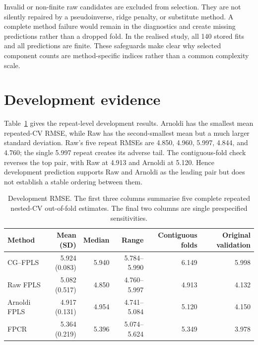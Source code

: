 Invalid or non-finite raw candidates are excluded from selection.  They are not
silently repaired by a pseudoinverse, ridge penalty, or substitute method.  A
complete method failure would remain in the diagnostics and create missing
predictions rather than a dropped fold.  In the realised study, all 140 stored
fits and all predictions are finite.  These safeguards make clear why selected
component counts are method-specific indices rather than a common complexity
scale.

\section{Development evidence}
\label{sec:app-spectroscopy-development}

Table~\ref{tab:app-spectroscopy-development-rmse} gives the repeat-level
development results.  Arnoldi has the smallest mean repeated-CV RMSE, while
Raw has the second-smallest mean but a much larger standard deviation.  Raw's
five repeat RMSEs are 4.850, 4.960, 5.997, 4.844, and 4.760; the single 5.997
repeat creates its adverse tail.  The contiguous-fold check reverses the top
pair, with Raw at 4.913 and Arnoldi at 5.120.  Hence development prediction
supports Raw and Arnoldi as the leading pair but does not establish a stable
ordering between them.

\begin{table}[htbp]
    \centering
    \scriptsize
    \caption[Repeated-development prediction errors]{Development RMSE.  The first three columns summarise five complete
    repeated nested-CV out-of-fold estimates.  The final two columns are single
    prespecified sensitivities.}
    \label{tab:app-spectroscopy-development-rmse}
    \begin{tabular}{@{}lrrrrr@{}}
        \toprule
        Method & Mean (SD) & Median & Range & Contiguous folds & Original validation \\
        \midrule
        CG--FPLS     & 5.924 (0.083) & 5.940 & 5.784--5.990 & 6.149 & 5.998 \\
        Raw FPLS     & 5.082 (0.517) & 4.850 & 4.760--5.997 & 4.913 & 4.132 \\
        Arnoldi FPLS & 4.917 (0.131) & 4.954 & 4.741--5.084 & 5.120 & 4.150 \\
        FPCR         & 5.364 (0.219) & 5.396 & 5.074--5.624 & 5.349 & 3.978 \\
        \bottomrule
    \end{tabular}
\end{table}

